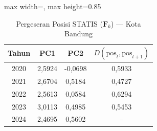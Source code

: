 \begin{table}[H]
\centering
\caption{Pergeseran Posisi STATIS ($\mathbf{F}_k$) --- Kota Bandung} \label{tab:app1jarak_statis_skor_kota_bandung}
\begin{adjustbox}{max width=\textwidth, max height=0.85\textheight}
\begin{tabular}{|c|c|c|c|}
\hline
\textbf{Tahun} & \textbf{PC1} & \textbf{PC2} & \textbf{$D(\text{pos}_t, \text{pos}_{t+1})$} \\
\hline
2020 & 2,5924 & -0,0698 & 0,5933 \\
2021 & 2,6704 & 0,5184 & 0,4727 \\
2022 & 2,5613 & 0,0584 & 0,6294 \\
2023 & 3,0113 & 0,4985 & 0,5453 \\
2024 & 2,4695 & 0,5602 & -- \\
\hline
\end{tabular}
\end{adjustbox}
\end{table}